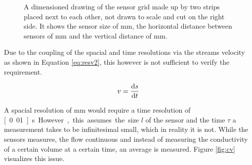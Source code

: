 \begin{figure}[H]
\begin{center}
		\caption{A dimensioned drawing of the sensor grid made up by two strips placed next to each other, not drawn to scale and cut on the right side. It shows the sensor size of \unit[10x11]{mm}, the horizontal distance between sensors of \unit[50]{mm} and the vertical distance of \unit[25]{mm}.}
		\label{fig:sensarray}
	\end{center}
\end{figure}

Due to the coupling of the spacial and time resolutions via the streams velocity as shown in Equation \eqref{eq:resv2}, this however is not sufficient to verify the requirement. 

\begin{equation}
	v = \dfrac{\mathop{}\!\mathrm{d} s}{\mathop{}\!\mathrm{d} t}
\label{eq:resv2} 
\end{equation}

A spacial resolution of \unit[10]{mm} would require a time resolution of \unit[0.01]{s}. However, this assumes the size $ l $ of the sensor and the time $ \tau $ a measurement takes to be infinitesimal small, which in reality it is not. While the sensors measures, the flow continuous and instead of measuring the conductivity of a certain volume at a certain time, an average is measured. Figure \ref{fig:cv} visualizes this issue.

